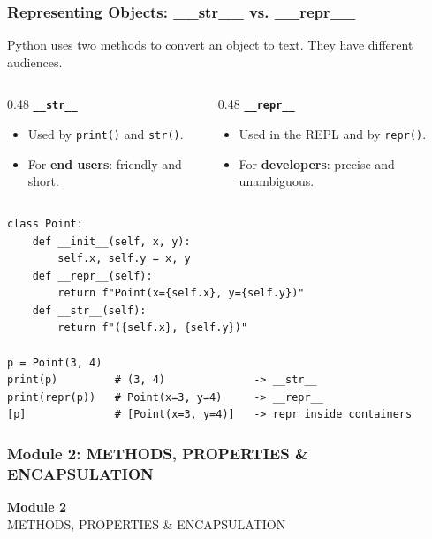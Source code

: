 \documentclass[aspectratio=169,10pt]{beamer}
\newcommand{\keyword}[1]{\textcolor{PrimaryBlue}{\textbf{#1}}}
\newcommand{\codeword}[1]{\texttt{#1}}
\begin{document}
\begin{frame}[fragile]
\frametitle{Representing Objects: \_\_str\_\_ vs. \_\_repr\_\_}
\small
Python uses two methods to convert an object to text. They have different audiences.

\vspace{0.12cm}
\begin{columns}[T,totalwidth=0.96\textwidth]
\begin{column}{0.48\textwidth}
\textbf{\codeword{\_\_str\_\_}}
\begin{itemize}\setlength\itemsep{0.04cm}
  \item Used by \codeword{print()} and \codeword{str()}.
  \item For \keyword{end users}: friendly and short.
\end{itemize}
\end{column}
\begin{column}{0.48\textwidth}
\textbf{\codeword{\_\_repr\_\_}}
\begin{itemize}\setlength\itemsep{0.04cm}
  \item Used in the REPL and by \codeword{repr()}.
  \item For \keyword{developers}: precise and unambiguous.
\end{itemize}
\end{column}
\end{columns}

\vspace{0.18cm}
\begin{lstlisting}[style=pycode]
class Point:
    def __init__(self, x, y):
        self.x, self.y = x, y
    def __repr__(self):
        return f"Point(x={self.x}, y={self.y})"
    def __str__(self):
        return f"({self.x}, {self.y})"

p = Point(3, 4)
print(p)         # (3, 4)              -> __str__
print(repr(p))   # Point(x=3, y=4)     -> __repr__
[p]              # [Point(x=3, y=4)]   -> repr inside containers
\end{lstlisting}
\end{frame}


\begin{noheadline}
\begin{frame}
\frametitle{Module 2: METHODS, PROPERTIES \& ENCAPSULATION}
\vspace{1.2cm}
\begin{center}
  {\fontsize{30}{36}\selectfont\textbf{Module 2}}\\[0.35cm]
  {\fontsize{18}{22}\selectfont METHODS, PROPERTIES \& ENCAPSULATION}\\[0.7cm]
\end{center}
\end{frame}
\end{noheadline}
\end{document}
